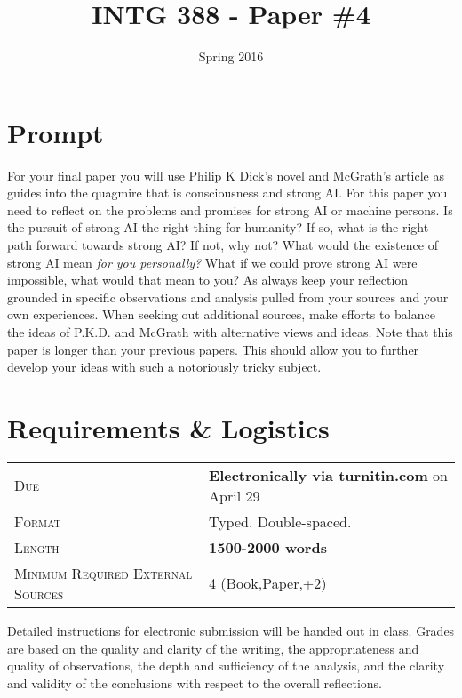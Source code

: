 \documentclass[]{tufte-handout}
\title{INTG 388 - Paper \#4 }
\author{}
\date{ Spring 2016 }
\begin{document}
\maketitle

\section{Prompt}

For your final paper you will use Philip K Dick's novel\citep{dick_androids_2008} and McGrath's article\citep{mcgrath_religion_2011} as guides into the quagmire that is consciousness and strong AI. For this paper you need to reflect on the problems and promises for strong AI or machine persons. Is the pursuit of strong AI the right thing for humanity? If so, what is the right path forward towards strong AI? If not, why not? What would the existence of strong AI mean \textit{for you personally?} What if we could prove strong AI were impossible, what would that mean to you? As always keep your reflection grounded in specific observations and analysis pulled from your sources and your own experiences. When seeking out additional sources, make efforts to balance the ideas of P.K.D. and McGrath with alternative views and ideas. Note that this paper is longer than your previous papers. This should allow you to further develop your ideas with such a notoriously tricky subject.  

\section{Requirements \& Logistics}

\begin{tabular}{ll}
\textsc{Due} & \textbf{Electronically via turnitin.com} on April 29  \\
\textsc{Format} & Typed. Double-spaced. \\
\textsc{Length} & \textbf{1500-2000 words} \\
\textsc{Minimum Required External Sources} & 4 (Book,Paper,+2)
\end{tabular}


\vspace{.1in}

Detailed instructions for electronic submission will be handed out in class. Grades are based on the quality and clarity of the writing, the appropriateness and quality of observations, the depth and sufficiency of the analysis, and the clarity and validity of the conclusions with respect to the overall reflections.  



\end{document}

